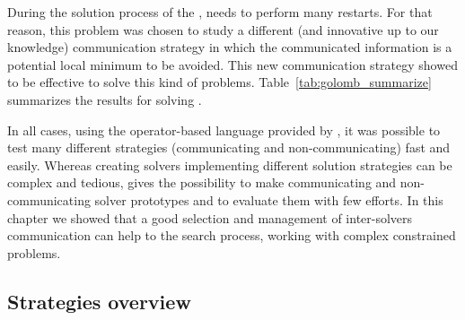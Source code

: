 During the solution process of the \grp{}, \posl{} needs to perform many restarts. For that reason, this problem was chosen to study a different (and innovative up to our knowledge) communication strategy in which the communicated information is a potential local minimum to be avoided. This new communication strategy showed to be effective to solve this kind of problems. Table~\ref{tab:golomb_summarize} summarizes the results for solving \GRP.

\begin{table}[h]
\captionsetup{belowskip=6pt,aboveskip=6pt}
\centering 
\renewcommand{\arraystretch}{1}
\caption{Summarizing results for \GRP{}}
\label{tab:golomb_summarize}
\end{table}

In all cases, using the operator-based language provided by \posl{}, it was possible to test many different strategies (communicating and non-communicating) fast and easily. Whereas creating solvers implementing different solution strategies can be complex and tedious, \posl{} gives the possibility to make communicating and non-communicating solver prototypes and to evaluate them with few efforts. In this chapter we showed that a good selection and management of inter-solvers communication can %
help to the search process, working with complex constrained problems.

\subsection{Strategies overview}
